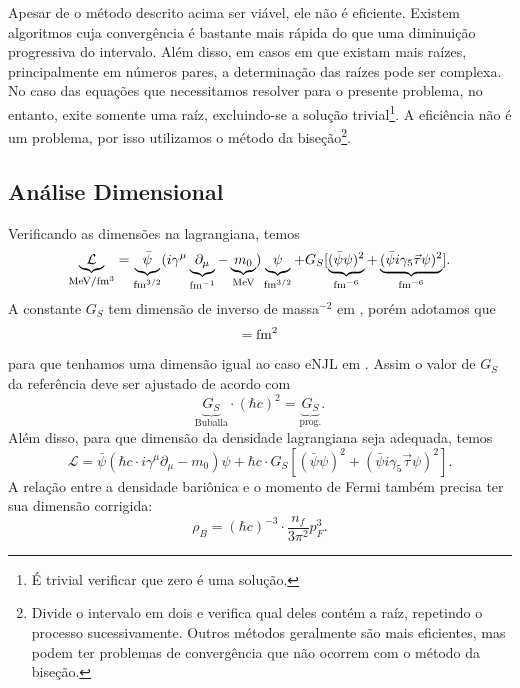 Apesar de o método descrito acima ser viável, ele não é eficiente. Existem algoritmos cuja convergência é bastante mais rápida do que uma diminuição progressiva do intervalo. Além disso, em casos em que existam mais raízes, principalmente em números pares, a determinação das raízes pode ser complexa. No caso das equações que necessitamos resolver para o presente problema, no entanto, exite somente uma raíz, excluindo-se a solução trivial\footnote{É trivial verificar que zero é uma solução.}. A eficiência não é um problema, por isso utilizamos o método da biseção\footnote{Divide o intervalo em dois e verifica qual deles contém a raíz, repetindo o processo sucessivamente. Outros métodos geralmente são mais eficientes, mas podem ter problemas de convergência que não ocorrem com o método da biseção.}.

\subsection{Análise Dimensional}

Verificando as dimensões na lagrangiana, temos
\begin{equation}
	\underbrace{\mathcal{L}}_{\mathcal{\rm{MeV}/\rm{fm}^3}} = \underbrace{\bar{\psi}}_{\rm{fm}^{3/2}}(i\gamma^\mu\underbrace{\partial_\mu}_{\rm{fm}^{-1}} - \underbrace{m_0}_{\rm{MeV}})\underbrace{\psi}_{\rm{fm}^{3/2}} + G_S [ \underbrace{(\bar{\psi}\psi)^2}_{\rm{fm}^{-6}} + \underbrace{(\bar{\psi}i\gamma_5\vec{\tau}\psi)^2}_{\rm{fm}^{-6}}].
\end{equation}
%
A constante $G_S$ tem dimensão de inverso de massa$^{-2}$ em \textcite{Buballa1996}, porém adotamos que 
\begin{equation}
	[G_S] = \rm{fm}^{2}
\end{equation}
%
para que tenhamos uma dimensão igual ao caso eNJL em \textcite{Pais}. Assim o valor de $G_S$ da referência deve ser ajustado de acordo com
\begin{equation}
	\underbrace{G_S}_{\textrm{Buballa}} \cdot (\hbar c)^2 = \underbrace{G_S}_{\textrm{prog.}}.
\end{equation}
%
Além disso, para que dimensão da densidade lagrangiana seja adequada, temos
\begin{equation}
	\mathcal{L} = \bar{\psi}(\hbar c \cdot i\gamma^\mu\partial_\mu - m_0)\psi + \hbar c \cdot G_S[(\bar{\psi}\psi)^2 + (\bar{\psi}i\gamma_5\vec{\tau}\psi)^2].
\end{equation}
%
A relação entre a densidade bariônica e o momento de Fermi também precisa ter sua dimensão corrigida:
\begin{equation}
	\rho_B = (\hbar c)^{-3} \cdot \frac{n_f}{3\pi^2}p_F^3.
\end{equation}

